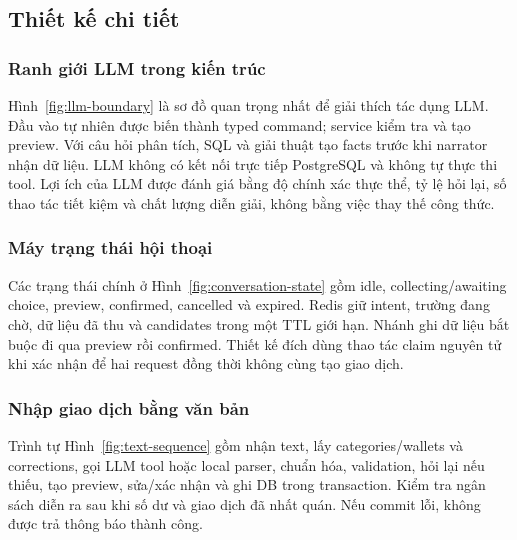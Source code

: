 \subsection{Thiết kế chi tiết}

\subsubsection{Ranh giới LLM trong kiến trúc}


Hình~\ref{fig:llm-boundary} là sơ đồ quan trọng nhất để giải thích tác dụng LLM. Đầu vào tự nhiên được biến thành typed command; service kiểm tra và tạo preview. Với câu hỏi phân tích, SQL và giải thuật tạo facts trước khi narrator nhận dữ liệu. LLM không có kết nối trực tiếp PostgreSQL và không tự thực thi tool. Lợi ích của LLM được đánh giá bằng độ chính xác thực thể, tỷ lệ hỏi lại, số thao tác tiết kiệm và chất lượng diễn giải, không bằng việc thay thế công thức.

\subsubsection{Máy trạng thái hội thoại}


Các trạng thái chính ở Hình~\ref{fig:conversation-state} gồm idle, collecting/awaiting choice, preview, confirmed, cancelled và expired. Redis giữ intent, trường đang chờ, dữ liệu đã thu và candidates trong một TTL giới hạn. Nhánh ghi dữ liệu bắt buộc đi qua preview rồi confirmed. Thiết kế đích dùng thao tác claim nguyên tử khi xác nhận để hai request đồng thời không cùng tạo giao dịch.

\subsubsection{Nhập giao dịch bằng văn bản}


Trình tự Hình~\ref{fig:text-sequence} gồm nhận text, lấy categories/wallets và corrections, gọi LLM tool hoặc local parser, chuẩn hóa, validation, hỏi lại nếu thiếu, tạo preview, sửa/xác nhận và ghi DB trong transaction. Kiểm tra ngân sách diễn ra sau khi số dư và giao dịch đã nhất quán. Nếu commit lỗi, không được trả thông báo thành công.

